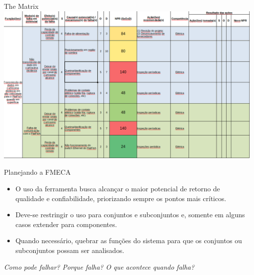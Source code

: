 \documentclass[aspectratio=169]{beamer}
\begin{document}
\begin{frame}[t]{The Matrix}
    \includegraphics[width=1\textwidth, trim={0 5cm 0 0},clip]{fmeca-matrix}
    \centering
\end{frame}
\begin{frame}[t]{Planejando a FMECA}
    \begin{itemize}
            \item O uso da ferramenta busca alcançar o maior potencial de retorno de qualidade e confiabilidade, priorizando sempre os pontos mais críticos.
            \item Deve-se restringir o uso para conjuntos e subconjuntos e, somente em alguns casos extender para componentes.
            \item Quando necessário, quebrar as funções do sistema para que os conjuntos ou subconjuntos possam ser analisados.
    \end{itemize}
    \vspace{1cm}
    \hspace*{0.5cm}\emph{Como pode falhar? Porque falha? O que acontece quando falha?}

\end{frame}
\end{document}
